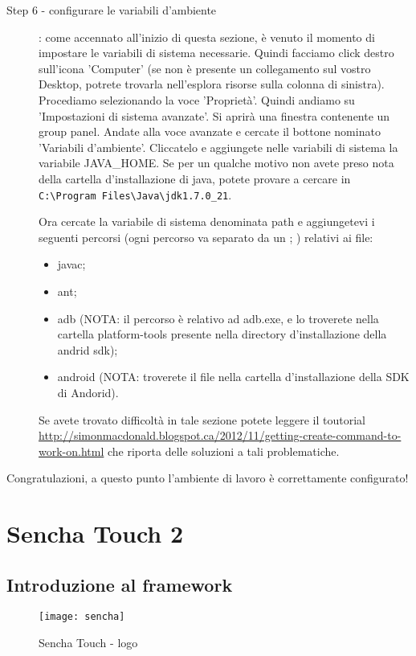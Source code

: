 \documentclass[10pt,a4paper,onecolumn]{article}
\begin{document}
\begin{description}
	\item[Step 6 - configurare le variabili d'ambiente] : come accennato all'inizio di questa sezione, è venuto il momento di impostare le variabili di sistema necessarie. Quindi facciamo click destro sull'icona 'Computer' (se non è presente un collegamento sul vostro Desktop, potrete trovarla nell'esplora risorse sulla colonna di sinistra). Procediamo selezionando la voce 'Proprietà'. Quindi andiamo su 'Impostazioni di sistema avanzate'. Si aprirà una finestra contenente un group panel. Andate alla voce avanzate e cercate il bottone nominato 'Variabili d'ambiente'. Cliccatelo e aggiungete nelle variabili di sistema la variabile JAVA\_HOME. Se per un qualche motivo non avete preso nota della cartella d'installazione di java, potete provare a cercare in \verb|C:\Program Files\Java\jdk1.7.0_21|.
	
	Ora cercate la variabile di sistema denominata path e aggiungetevi i seguenti percorsi (ogni percorso va separato da un ; ) relativi ai file:
	\begin{itemize}
		\item javac;
		\item ant;
		\item adb (NOTA: il percorso è relativo ad adb.exe, e lo troverete nella cartella platform-tools presente nella directory d'installazione della andrid sdk);
		\item android (NOTA: troverete il file nella cartella d'installazione della SDK di Andorid).
	\end{itemize}
	
	Se avete trovato difficoltà in tale sezione potete leggere il toutorial \url{http://simonmacdonald.blogspot.ca/2012/11/getting-create-command-to-work-on.html} che riporta delle soluzioni a tali problematiche.

\end{description}

Congratulazioni, a questo punto l'ambiente di lavoro è correttamente configurato!

\clearpage

\section{Sencha Touch 2}
\subsection{Introduzione al framework}

\begin{figure}[h]
	\centering
	\texttt{[image: sencha]}
	\caption{Sencha Touch - logo}						
	\label{fig:sencha logo}
\end{figure}
\end{document}
